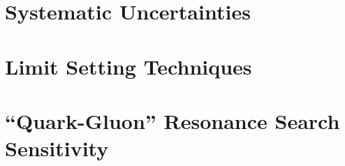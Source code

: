 \documentclass[NOTE, atlasdraft=true, texlive=2016, UKenglish]{atlasdoc}
\begin{document}
%

%
%
%
\section{Systematic Uncertainties}
\label{sec:systematic_uncertainties}
%

%
\clearpage
%
%
%
\section{Limit Setting Techniques}

\clearpage


\section{``Quark-Gluon'' Resonance Search Sensitivity}
\label{sec:QGselection}




%
%
%
%
\end{document}
